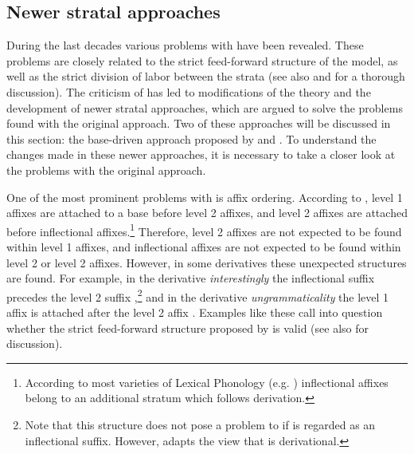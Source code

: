 \subsection{Newer stratal approaches}

During the last decades various problems with  have been revealed. These problems are closely related to the strict feed-forward structure of the model, as well as the strict division of labor between the strata (see also \citealt[chapter 2]{Giegerich.1999} and \citealt[chapter 7]{Plag.2003} for a thorough discussion). The criticism of  has led to modifications of the theory and the development of newer stratal approaches, which are argued to solve the problems found with the original approach. Two of these approaches will be discussed in this section: the base-driven approach proposed by \cite{Giegerich.1999} and . To understand the changes made in these newer approaches, it is necessary to take a closer look at the problems with the original approach.

One of the most prominent problems with  is affix ordering. According to , level 1 affixes are attached to a base before level 2 affixes, and level 2 affixes are attached before inflectional affixes.\footnote{According to most varieties of Lexical Phonology (e.g.  \citealt{Kiparsky.1982,Mohanan.1986}) inflectional affixes belong to an additional stratum which follows derivation.} Therefore, level 2 affixes are not expected to be found within level 1 affixes, and inflectional affixes are not expected to be found within level 2 or level 2 affixes. However, in some derivatives these unexpected structures are found. For example, in the derivative \textit{interestingly} the inflectional suffix  precedes the level 2 suffix ,\footnote{Note that this structure does not pose a problem to  if  is regarded as an inflectional suffix. However,  adapts the view that  is derivational. } and in the derivative \textit{ungrammaticality} the level 1 affix  is attached after the level 2 affix . Examples like these call into question whether the strict feed-forward structure proposed by  is valid (see also \citet[chapter 4]{Plag.1999} for discussion).

